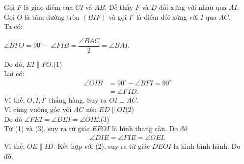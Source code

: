 \begin{bt}
{\begin{nx}
\begin{enumerate}
\begin{enumerate}
\begin{center}
					\end{center}
					Gọi $F$ là giao điểm của $CI$ và $AB$. Dễ thấy $F$ và $D$ đối xứng với nhau qua $AI$.\\
					Gọi $O$ là tâm đường tròn $(BIF)$ và gọi $I'$ là điểm đối xứng với $I$ qua $AC$.\\
					Ta có:
					\begin{center}
						$\angle BFO=90^\circ-\angle FIB=\dfrac{\angle BAC}{2}=\angle BAI$.
					\end{center}
					Do đó, $EI\parallel FO$.\hfill(1)\\
					Lại có:
					\begin{align*}
					\angle OIB&=90^\circ-\angle BFI=90^\circ\\&=\angle I'ID.
					\end{align*}
					Vì thế, $O,I,I'$ thẳng hàng. Suy ra $OI\perp AC$.\\
					Vì cùng vuông góc với $AC$ nên $ED\parallel OI$\hfill(2)\\
					Do đó $\angle FEI=\angle DEI=\angle OIE$.\hfill(3)\\
					Từ (1) và (3), suy ra tứ giác $EFOI$ là hình thang cân. Do đó
					\begin{align*}
					\angle DIE=\angle FIE=\angle OEI.
					\end{align*}
					Vì thế, $OE\parallel ID$. Kết hợp với (2), suy ra tứ giác $DEOI$ la hình bình hành. Do đó,

\end{enumerate}
\end{enumerate}
\end{nx}}
\end{bt}
